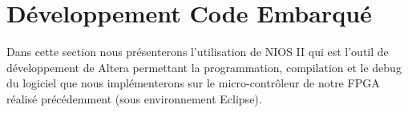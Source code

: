 \section{Développement Code Embarqué}
Dans cette section nous présenterons l'utilisation de NIOS II qui est l'outil de développement de Altera permettant la programmation, compilation et le debug du logiciel que nous implémenterons sur le micro-contrôleur de notre FPGA réalisé précédemment (sous environnement Eclipse).\newline
